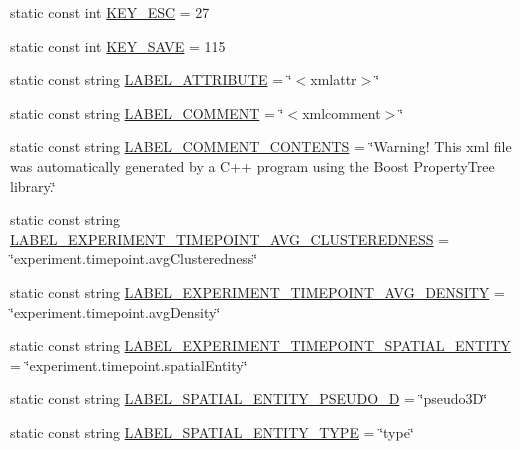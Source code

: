 \begin{DoxyCompactItemize}
\item 
static const int \hyperlink{classmultiscale_1_1analysis_1_1Detector_a0d1f2fd9eae1b166ac097668889c02aa}{K\-E\-Y\-\_\-\-E\-S\-C} = 27
\item 
static const int \hyperlink{classmultiscale_1_1analysis_1_1Detector_aa9acc60392e3eb0f0a9c3019c63301ae}{K\-E\-Y\-\_\-\-S\-A\-V\-E} = 115
\item 
static const string \hyperlink{classmultiscale_1_1analysis_1_1Detector_aa82a238495f03f285893ea3345437224}{L\-A\-B\-E\-L\-\_\-\-A\-T\-T\-R\-I\-B\-U\-T\-E} = \char`\"{}$<$xmlattr$>$\char`\"{}
\item 
static const string \hyperlink{classmultiscale_1_1analysis_1_1Detector_a561d5a58b94e4ccce28726c98f6ca71e}{L\-A\-B\-E\-L\-\_\-\-C\-O\-M\-M\-E\-N\-T} = \char`\"{}$<$xmlcomment$>$\char`\"{}
\item 
static const string \hyperlink{classmultiscale_1_1analysis_1_1Detector_adf6527cf12c5267d28210a0a60ce43cf}{L\-A\-B\-E\-L\-\_\-\-C\-O\-M\-M\-E\-N\-T\-\_\-\-C\-O\-N\-T\-E\-N\-T\-S} = \char`\"{}Warning! This xml file was automatically generated by a C++ program using the Boost Property\-Tree library.\char`\"{}
\item 
static const string \hyperlink{classmultiscale_1_1analysis_1_1Detector_a6c760d7a38adaa29648e55c630f7e170}{L\-A\-B\-E\-L\-\_\-\-E\-X\-P\-E\-R\-I\-M\-E\-N\-T\-\_\-\-T\-I\-M\-E\-P\-O\-I\-N\-T\-\_\-\-A\-V\-G\-\_\-\-C\-L\-U\-S\-T\-E\-R\-E\-D\-N\-E\-S\-S} = \char`\"{}experiment.\-timepoint.\-avg\-Clusteredness\char`\"{}
\item 
static const string \hyperlink{classmultiscale_1_1analysis_1_1Detector_a58b3f6ced9dd62bea93678fb6893524a}{L\-A\-B\-E\-L\-\_\-\-E\-X\-P\-E\-R\-I\-M\-E\-N\-T\-\_\-\-T\-I\-M\-E\-P\-O\-I\-N\-T\-\_\-\-A\-V\-G\-\_\-\-D\-E\-N\-S\-I\-T\-Y} = \char`\"{}experiment.\-timepoint.\-avg\-Density\char`\"{}
\item 
static const string \hyperlink{classmultiscale_1_1analysis_1_1Detector_a8cade9693bb6ce63be30adebd318fd21}{L\-A\-B\-E\-L\-\_\-\-E\-X\-P\-E\-R\-I\-M\-E\-N\-T\-\_\-\-T\-I\-M\-E\-P\-O\-I\-N\-T\-\_\-\-S\-P\-A\-T\-I\-A\-L\-\_\-\-E\-N\-T\-I\-T\-Y} = \char`\"{}experiment.\-timepoint.\-spatial\-Entity\char`\"{}
\item 
static const string \hyperlink{classmultiscale_1_1analysis_1_1Detector_afc891454d41c2ede5e4b3155798045c4}{L\-A\-B\-E\-L\-\_\-\-S\-P\-A\-T\-I\-A\-L\-\_\-\-E\-N\-T\-I\-T\-Y\-\_\-\-P\-S\-E\-U\-D\-O\-\_\-D} = \char`\"{}pseudo3\-D\char`\"{}
\item 
static const string \hyperlink{classmultiscale_1_1analysis_1_1Detector_ac93f1fd6bdc7250b890480c7d5acf5b0}{L\-A\-B\-E\-L\-\_\-\-S\-P\-A\-T\-I\-A\-L\-\_\-\-E\-N\-T\-I\-T\-Y\-\_\-\-T\-Y\-P\-E} = \char`\"{}type\char`\"{}

\end{DoxyCompactItemize}
